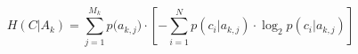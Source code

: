 \begin{equation}
    H( C \vert A_k ) = \sum_{j=1}^{M_k}{p(a_{k,j}}) \cdot [ -\sum_{i=1}^{N}p(c_i\vert a_{k,j})\cdot \log_2p(c_i \vert a_{k,j})] 
\end{equation}
